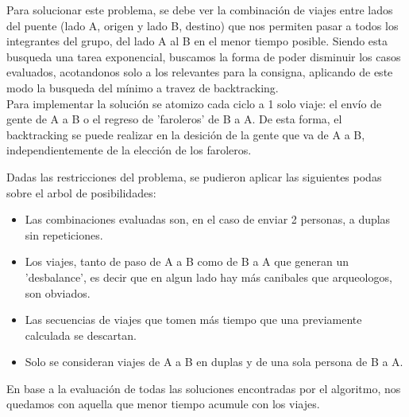 Para solucionar este problema, se debe ver la combinaci\'on de viajes entre lados del puente (lado A, origen y lado B, destino) que nos permiten pasar a todos los integrantes
del grupo, del lado A al B en el menor tiempo posible. Siendo esta busqueda una tarea exponencial, buscamos la forma de poder disminuir los casos evaluados, acotandonos solo a los relevantes
para la consigna, aplicando de este modo la busqueda del m\'inimo a travez de backtracking.\\


Para implementar la solución se atomizo cada ciclo a 1 solo viaje: el env\'io de gente de A a B o el regreso de 'faroleros' de B a A. De esta forma, el backtracking se puede realizar en 
la desición de la gente que va de A a B, independientemente de la elección de los faroleros.

Dadas las restricciones del problema, se pudieron aplicar las siguientes podas sobre el arbol de posibilidades:
\begin{itemize}
	\item Las combinaciones evaluadas son, en el caso de enviar 2 personas, a duplas sin repeticiones.
	\item Los viajes, tanto de paso de A a B como de B a A que generan un 'desbalance', es decir que en algun lado hay más canibales que arqueologos, son obviados.
	\item Las secuencias de viajes que tomen más tiempo que una previamente calculada se descartan.
	\item Solo se consideran viajes de A a B en duplas y de una sola persona de B a A.
\end{itemize}

En base a la evaluación de todas las soluciones encontradas por el algoritmo, nos quedamos con aquella que menor tiempo acumule con los viajes.
